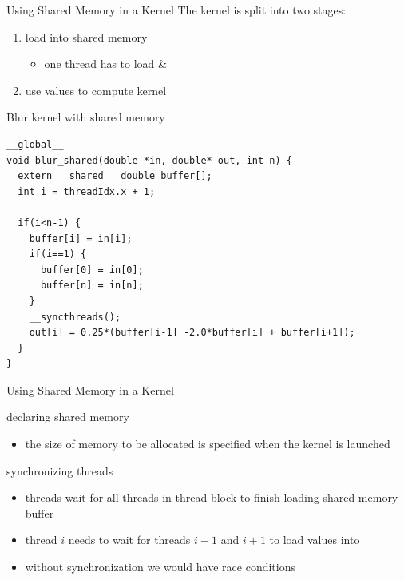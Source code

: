 \begin{frame}[fragile]{Using Shared Memory in a Kernel}
    The kernel is split into two stages:
    \begin{enumerate}
        \item load  into shared memory 
        \begin{itemize}
            \item one thread has to load  \& 
        \end{itemize}
        \item use values  to compute kernel
    \end{enumerate}

    \begin{code}{Blur kernel with shared memory}
        \begin{lstlisting}[style=boxcudatiny]
__global__
void blur_shared(double *in, double* out, int n) {
  extern __shared__ double buffer[];
  int i = threadIdx.x + 1;

  if(i<n-1) {
    buffer[i] = in[i];
    if(i==1) {
      buffer[0] = in[0];
      buffer[n] = in[n];
    }
    __syncthreads();
    out[i] = 0.25*(buffer[i-1] -2.0*buffer[i] + buffer[i+1]);
  }
}
        \end{lstlisting}
    \end{code}

\end{frame}

\begin{frame}[fragile]{Using Shared Memory in a Kernel}
    \begin{info}{declaring shared memory}
        \centering {}
        \begin{itemize}
            \item the size of memory to be allocated is specified when the kernel is launched
        \end{itemize}
    \end{info}

    \begin{info}{synchronizing threads}
        \centering {}
        \begin{itemize}
            \item threads wait for all threads in thread block to finish loading shared memory buffer
            \item thread $i$ needs to wait for threads $i-1$ and $i+1$ to load values into 
            \item without synchronization we would have race conditions
        \end{itemize}
    \end{info}

\end{frame}


